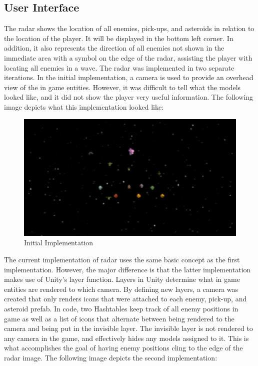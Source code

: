 \documentclass[12pt]{article}       %
\def\hs{\hspace{15pt}}
\begin{document}
\subsection{User Interface} %

	\hs {\bf Radar:} The radar shows the location of all enemies, pick-ups, and asteroids in relation to the location of the player. It will be displayed in the bottom left corner. In addition, it also represents the direction of all enemies not shown in the immediate area with a symbol on the edge of the radar, assisting the player with locating all enemies in a wave. The radar was implemented in two separate iterations. In the initial implementation, a camera is used to provide an overhead view of the in game entities. However, it was difficult to tell what the models looked like, and it did not show the player very useful information. The following image depicts what this implementation looked like:

\begin{figure} [H]
\centering
\includegraphics[width=4.5in]{minimapExample1.png}
\caption{Initial Implementation} \label{RadarOne}
\end{figure}

	The current implementation of radar uses the same basic concept as the first implementation. However, the major difference is that the latter implementation makes use of Unity's layer function. Layers in Unity determine what in game entities are rendered to which camera. By defining new layers, a camera was created that only renders icons that were attached to each enemy, pick-up, and asteroid prefab. In code, two Hashtables keep track of all enemy positions in game as well as a list of icons that alternate between being rendered to the camera and being put in the invisible layer. The invisible layer is not rendered to any camera in the game, and effectively hides any models assigned to it. This is what accomplishes the goal of having enemy positions cling to the edge of the radar image. The following image depicts the second implementation:
\end{document}
